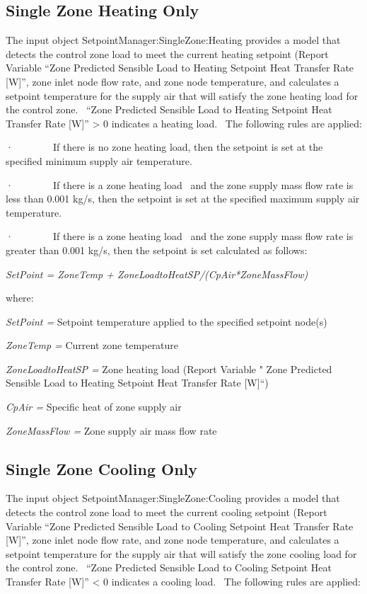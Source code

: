 \subsection{Single Zone Heating Only}\label{single-zone-heating-only}

The input object SetpointManager:SingleZone:Heating provides a model that detects the control zone load to meet the current heating setpoint (Report Variable ``Zone Predicted Sensible Load to Heating Setpoint Heat Transfer Rate {[}W{]}'', zone inlet node flow rate, and zone node temperature, and calculates a setpoint temperature for the supply air that will satisfy the zone heating load for the control zone.~ ``Zone Predicted Sensible Load to Heating Setpoint Heat Transfer Rate {[}W{]}'' \textgreater{} 0 indicates a heating load.~ The following rules are applied:

·~~~~~~~~If there is no zone heating load, then the setpoint is set at the specified minimum supply air temperature.

·~~~~~~~~If there is a zone heating load~ and the zone supply mass flow rate is less than 0.001 kg/s, then the setpoint is set at the specified maximum supply air temperature.

·~~~~~~~~If there is a zone heating load~ and the zone supply mass flow rate is greater than 0.001 kg/s, then the setpoint is set calculated as follows:

\emph{SetPoint = ZoneTemp + ZoneLoadtoHeatSP/(CpAir*ZoneMassFlow)}

where:

\emph{SetPoint =} Setpoint temperature applied to the specified setpoint node(s)

\emph{ZoneTemp =} Current zone temperature

\emph{ZoneLoadtoHeatSP =} Zone heating load (Report Variable " Zone Predicted Sensible Load to Heating Setpoint Heat Transfer Rate {[}W{]}``)

\emph{CpAir =} Specific heat of zone supply air

\emph{ZoneMassFlow =} Zone supply air mass flow rate

\subsection{Single Zone Cooling Only}\label{single-zone-cooling-only}

The input object SetpointManager:SingleZone:Cooling provides a model that detects the control zone load to meet the current cooling setpoint (Report Variable ``Zone Predicted Sensible Load to Cooling Setpoint Heat Transfer Rate {[}W{]}'', zone inlet node flow rate, and zone node temperature, and calculates a setpoint temperature for the supply air that will satisfy the zone cooling load for the control zone.~ ``Zone Predicted Sensible Load to Cooling Setpoint Heat Transfer Rate {[}W{]}'' \textless{} 0 indicates a cooling load.~ The following rules are applied:

